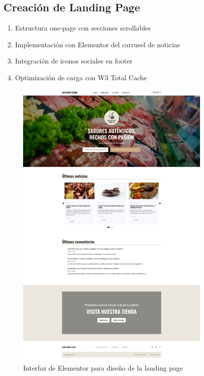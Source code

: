 \documentclass[a4paper]{article}
\begin{document}
\subsection{Creación de Landing Page}
\begin{enumerate}
    \item Estructura one-page con secciones scrollables
    \item Implementación con Elementor del carrusel de noticias
    \item Integración de iconos sociales en footer
    \item Optimización de carga con W3 Total Cache
\end{enumerate}

\begin{figure}[H]
    \centering
    \includegraphics[width=0.85\textwidth]{images/landing-page.png}
    \caption{Interfaz de Elementor para diseño de la landing page}
\end{figure}
\end{document}
